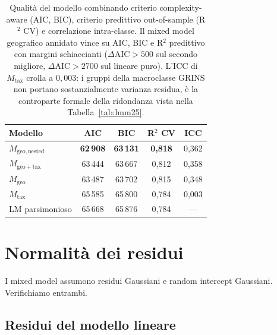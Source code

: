\documentclass[11pt,a4paper]{article}
\begin{document}
\begin{table}[h!]
  \centering
  \begin{tabular}{l c c c c}
    \toprule
    Modello & AIC & BIC & R$^{2}$ CV & ICC \\
    \midrule
    $M_{\mathrm{geo,nested}}$  & \textbf{62\,908} & \textbf{63\,131} & \textbf{0,818} & 0,362 \\
    $M_{\mathrm{geo+tax}}$     & 63\,444 & 63\,667 & 0,812 & 0,358 \\
    $M_{\mathrm{geo}}$         & 63\,487 & 63\,702 & 0,815 & 0,348 \\
    $M_{\mathrm{tax}}$         & 65\,585 & 65\,800 & 0,784 & 0,003 \\
    LM parsimonioso            & 65\,668 & 65\,876 & 0,784 & --- \\
    \bottomrule
  \end{tabular}
  \caption{Qualit\`a del modello combinando criterio
    complexity-aware (AIC, BIC), criterio predittivo out-of-sample
    (R$^{2}$ CV) e correlazione intra-classe. Il mixed model
    geografico annidato vince su AIC, BIC e R$^{2}$ predittivo con
    margini schiaccianti ($\Delta \mathrm{AIC} > 500$ sul secondo
    migliore, $\Delta \mathrm{AIC} > 2700$ sul lineare puro).
    L'ICC di $M_{\mathrm{tax}}$ crolla a $0{,}003$: i gruppi della
    macroclasse GRINS non portano sostanzialmente varianza residua,
    \`e la controparte formale della ridondanza vista nella
    Tabella~\ref{tab:lmm25}.}
  \label{tab:aicbic}
\end{table}

\section{Normalit\`a dei residui}

I mixed model assumono residui Gaussiani e random intercept
Gaussiani. Verifichiamo entrambi.

\subsection{Residui del modello lineare}
\end{document}
